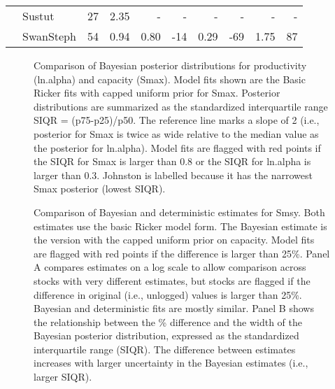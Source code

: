 \documentclass[french,11pt]{book}
\begin{document}
\begin{longtable}[t]{llrrrrrrrr}
& Sustut & 27 & 2.35 & - & - & - & - & - & -\\  & SwanSteph & 54 & 0.94 & 0.80 & -14 & 0.29 & -69 & 1.75 & 87\\* \end{longtable}

\endgroup{} \endgroup{}

\clearpage


\begin{figure}[htb]

{\centering {} 

}

\caption{Comparison of Bayesian posterior distributions for productivity (ln.alpha) and capacity (Smax). Model fits shown are the Basic Ricker fits with capped uniform prior for Smax. Posterior distributions are summarized as the standardized interquartile range SIQR = (p75-p25)/p50. The reference line marks a slope of 2 (i.e., posterior for Smax is twice as wide relative to the median value as the posterior for ln.alpha). Model fits are flagged with red points if the SIQR for Smax is larger than 0.8 or the SIQR for ln.alpha is larger than 0.3. Johnston is labelled because it has the narrowest Smax posterior (lowest SIQR).}\label{fig:FitsCompProdCap}
\end{figure}
\clearpage


\begin{figure}[htb]

{\centering {} 

}

\caption{Comparison of Bayesian and deterministic estimates for Smsy. Both estimates use the basic Ricker model form. The Bayesian estimate is the version with the capped uniform prior on capacity. Model fits are flagged with red points if the difference is larger than 25\%. Panel A compares estimates on a log scale to allow comparison across stocks with very different estimates, but stocks are flagged if the difference in original (i.e., unlogged) values is larger than 25\%. Bayesian and deterministic fits are mostly similar. Panel B shows the relationship between the \% difference and the width of the Bayesian posterior distribution, expressed as the standardized interquartile range (SIQR). The difference between estimates increases with larger uncertainty in the Bayesian estimates (i.e., larger SIQR).}\label{fig:FitsCompDetFig}
\end{figure}
\clearpage
\end{document}
